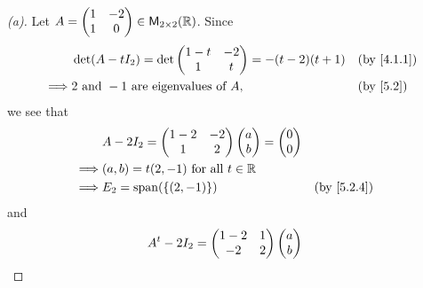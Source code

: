\begin{proof}[(a)]
	Let \(A = \begin{pmatrix}
		1 & -2 \\
		1 & 0
	\end{pmatrix} \in \ms[2][2][\R]\).
	Since
	\begin{align*}
		         & \det(A - t I_2) = \det\begin{pmatrix}
			                                 1 - t & -2 \\
			                                 1     & t
		                                 \end{pmatrix} = -(t - 2)(t + 1)            &  & \by{4.1.1} \\
		\implies & 2 \text{ and } -1 \text{ are eigenvalues of } A, &  & \by{5.2}
	\end{align*}
	we see that
	\begin{align*}
		         & A - 2I_2 = \begin{pmatrix}
			                      1 - 2 & -2 \\
			                      1     & 2
		                      \end{pmatrix} \begin{pmatrix}
			                                    a \\
			                                    b
		                                    \end{pmatrix} = \begin{pmatrix}
			                                                    0 \\
			                                                    0
		                                                    \end{pmatrix}     \\
		\implies & (a, b) = t(2, -1) \text{ for all } t \in \R                 \\
		\implies & E_2 = \spn{\set{(2, -1)}}                   &  & \by{5.2.4}
	\end{align*}
	and
	\begin{align*}
		         & {A}^{t} - 2I_2 = \begin{pmatrix}
			                           1 - 2 & 1 \\
			                           -2    & 2
		                           \end{pmatrix} \begin{pmatrix}
			                                         a \\
			                                         b

\end{pmatrix}
\end{align*}
\end{proof}
